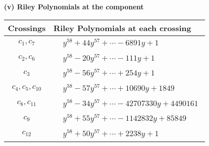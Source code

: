 \documentclass[1p]{elsarticle_modified}
\theoremstyle{definition}
\begin{document}
\flushleft \textbf{(v) Riley Polynomials at the component}\newline \\
\begin{tabular}{m{50pt}|m{274pt}}
Crossings & \hspace{64pt}Riley Polynomials at each crossing \\
\hline $$\begin{aligned}c_{1},c_{7}\end{aligned}$$&$\begin{aligned}
&y^{58}+44 y^{57}+\cdots-6891 y+1
\end{aligned}$\\
\hline $$\begin{aligned}c_{2},c_{6}\end{aligned}$$&$\begin{aligned}
&y^{58}-20 y^{57}+\cdots-111 y+1
\end{aligned}$\\
\hline $$\begin{aligned}c_{3}\end{aligned}$$&$\begin{aligned}
&y^{58}-56 y^{57}+\cdots+254 y+1
\end{aligned}$\\
\hline $$\begin{aligned}c_{4},c_{5},c_{10}\end{aligned}$$&$\begin{aligned}
&y^{58}-57 y^{57}+\cdots+10690 y+1849
\end{aligned}$\\
\hline $$\begin{aligned}c_{8},c_{11}\end{aligned}$$&$\begin{aligned}
&y^{58}-34 y^{57}+\cdots-42707330 y+4490161
\end{aligned}$\\
\hline $$\begin{aligned}c_{9}\end{aligned}$$&$\begin{aligned}
&y^{58}+55 y^{57}+\cdots-1142832 y+85849
\end{aligned}$\\
\hline $$\begin{aligned}c_{12}\end{aligned}$$&$\begin{aligned}
&y^{58}+50 y^{57}+\cdots+2238 y+1
\end{aligned}$\\
\hline
\end{tabular}\\~\\
\end{document}
